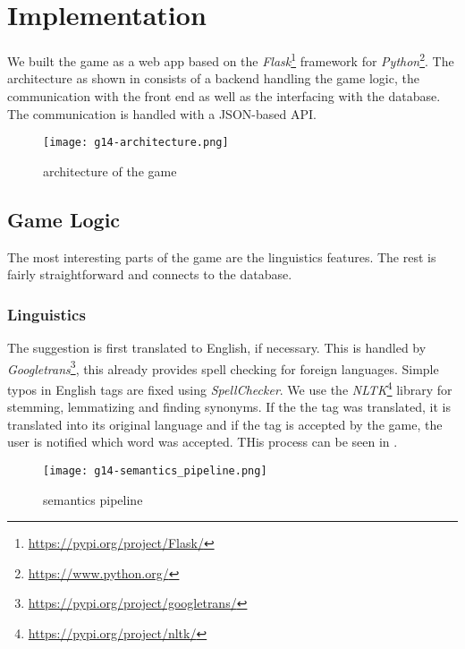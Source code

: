 \section{Implementation}
\label{g14:sec:implementation}

We built the game as a web app based on the \textit{Flask}\footnote{\url{https://pypi.org/project/Flask/}} framework for \textit{Python}\footnote{\url{https://www.python.org/}}. The architecture as shown in  consists of a backend handling the game logic, the communication with the front end as well as the interfacing with the database. The communication is handled with a JSON-based API.

\begin{figure}[!]
	\centering
	\texttt{[image: g14-architecture.png]}
	\caption{architecture of the game}
	\label{g14:fig:architecture}
\end{figure}

\subsection{Game Logic}
\label{g14:sec:implementation:game}

The most interesting parts of the game are the linguistics features. The rest is fairly straightforward and connects to the database.

\subsubsection{Linguistics}
\label{g14:sec:implementation:linguistics}
The suggestion is first translated to English, if necessary. This is handled by \textit{Googletrans}\footnote{\url{https://pypi.org/project/googletrans/}}, this already provides spell checking for foreign languages.
Simple typos in English tags are fixed using \textit{SpellChecker}. We use the \textit{NLTK}\footnote{\url{https://pypi.org/project/nltk/}} library for stemming, lemmatizing and finding synonyms. If the the tag was translated, it is translated into its original language and if the tag is accepted by the game, the user is notified which word was accepted. THis process can be seen in .

\begin{figure}[tb]
	\centering
	\texttt{[image: g14-semantics\_pipeline.png]}
	\caption{semantics pipeline}
	\label{g14:fig:semanticpipeline}
\end{figure}

